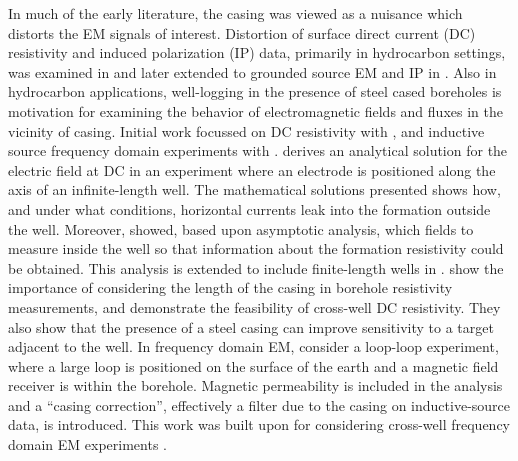 In much of the early literature, the casing was viewed as a nuisance which distorts the EM signals of interest. Distortion of surface direct current (DC) resistivity and induced polarization (IP) data, primarily in hydrocarbon settings, was examined in \citep{Wait1983, Holladay1984, Johnston1987} and later extended to grounded source EM and IP in \citep{Wait1985, Williams1985, Johnston1992}. Also in hydrocarbon applications, well-logging in the presence of steel cased boreholes is motivation for examining the behavior of electromagnetic fields and fluxes in the vicinity of casing. Initial work focussed on DC resistivity with \citep{Kaufman1990, Schenkel1990, Kaufman1993, Schenkel1994}, and inductive source frequency domain experiments with \citep{Augustin1989}. \cite{Kaufman1990} derives an analytical solution for the electric field at DC in an experiment where an electrode is positioned along the axis of an infinite-length well. The mathematical solutions presented shows how, and under what conditions, horizontal currents leak into the formation outside the well. Moreover, \cite{Kaufman1990} showed, based upon asymptotic analysis, which fields to measure inside the well so that information about the formation resistivity could be obtained. This analysis is extended to include finite-length wells in \cite{Kaufman1993}. \cite{Schenkel1994} show the importance of considering the length of the casing in borehole resistivity measurements, and demonstrate the feasibility of cross-well DC resistivity. They also show that the presence of a steel casing can improve sensitivity to a target adjacent to the well. In frequency domain EM, \cite{Augustin1989} consider a loop-loop experiment, where a large loop is positioned on the surface of the earth and a magnetic field receiver is within the borehole. Magnetic permeability is included in the analysis and a ``casing correction'', effectively a filter due to the casing on inductive-source data, is introduced. This work was built upon for considering cross-well frequency domain EM experiments \citep{Uchida1991, Wilt1996}.

